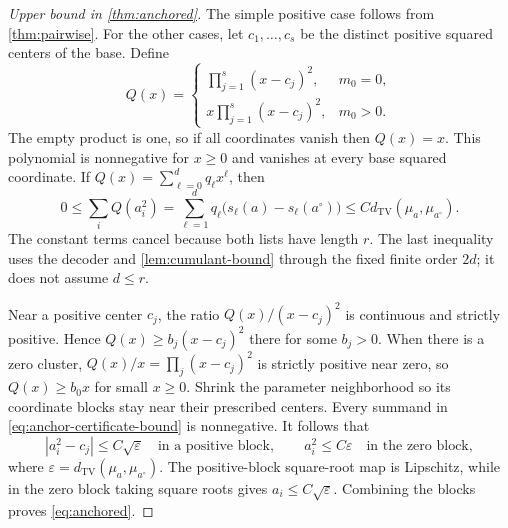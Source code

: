 \documentclass[11pt,a4paper]{article}
\numberwithin{equation}{section}
\theoremstyle{definition}
\theoremstyle{remark}
\newcommand{\TV}{d_{\mathrm{TV}}}
\newcommand{\base}{a^{\circ}}
\begin{document}
\begin{proof}[Upper bound in \cref{thm:anchored}]
The simple positive case follows from \cref{thm:pairwise}.  For the other cases,
let $c_1,\ldots,c_s$ be the distinct positive squared centers of the base.
Define
\begin{equation}
 Q(x)=
 \begin{cases}
 \displaystyle\prod_{j=1}^s(x-c_j)^2,&m_0=0,\\[0.4em]
 \displaystyle x\prod_{j=1}^s(x-c_j)^2,&m_0>0.
 \end{cases}
 \label{eq:anchor-certificate}
\end{equation}
The empty product is one, so if all coordinates vanish then $Q(x)=x$.
This polynomial is nonnegative for $x\ge0$ and vanishes at every base squared
coordinate.  If $Q(x)=\sum_{\ell=0}^d q_\ell x^\ell$, then
\begin{equation}
 0\le\sum_i Q(a_i^2)
 =\sum_{\ell=1}^d q_\ell\bigl(s_\ell(a)-s_\ell(\base)\bigr)
 \le C\TV(\mu_a,\mu_{\base}).
 \label{eq:anchor-certificate-bound}
\end{equation}
The constant terms cancel because both lists have length $r$.  The last
inequality uses the decoder and \cref{lem:cumulant-bound} through the fixed
finite order $2d$; it does not assume $d\le r$.

Near a positive center $c_j$, the ratio $Q(x)/(x-c_j)^2$ is continuous and
strictly positive.  Hence $Q(x)\ge b_j(x-c_j)^2$ there for some $b_j>0$.
When there is a zero cluster, $Q(x)/x=\prod_j(x-c_j)^2$ is strictly positive
near zero, so $Q(x)\ge b_0x$ for small $x\ge0$.  Shrink the parameter
neighborhood so its coordinate blocks stay near their prescribed centers.
Every summand in \eqref{eq:anchor-certificate-bound} is nonnegative.
It follows that
\[
 |a_i^2-c_j|\le C\sqrt\varepsilon\quad\text{in a positive block},
 \qquad a_i^2\le C\varepsilon\quad\text{in the zero block},
\]
where $\varepsilon=\TV(\mu_a,\mu_{\base})$.  The positive-block square-root map
is Lipschitz, while in the zero block taking square roots gives
$a_i\le C\sqrt\varepsilon$.  Combining the blocks proves
\eqref{eq:anchored}.
\end{proof}
\end{document}
